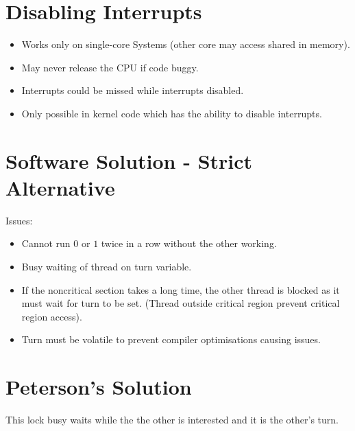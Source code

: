 \documentclass{report}
\begin{document}
    \section*{Disabling Interrupts}
        \begin{itemize}
            \item Works only on single-core Systems (other core may access shared in memory).
            \item May never release the CPU if code buggy.
            \item Interrupts could be missed while interrupts disabled.
            \item Only possible in kernel code which has the ability to disable interrupts.
        \end{itemize}
    \section*{Software Solution - Strict Alternative}
        \begin{minipage}[t]{0.5\textwidth}
        \end{minipage}
        \begin{minipage}[t]{0.5\textwidth}
        \end{minipage}
        Issues:
        \begin{itemize}
            \item Cannot run $0$ or $1$ twice in a row without the other working.
            \item Busy waiting of thread on turn variable.
            \item If the noncritical section takes a long time, the other thread is blocked as it must wait for turn to be set. (Thread outside critical region prevent critical region access).
            \item Turn must be volatile to prevent compiler optimisations causing issues.
        \end{itemize}
    \section*{Peterson's Solution}
        \begin{minipage}[t]{0.7\textwidth}
        \end{minipage}
        \begin{minipage}[t]{0.3\textwidth}
        \end{minipage}
        This lock busy waits while the the other is interested and it is the other's turn.
    
\end{document}
